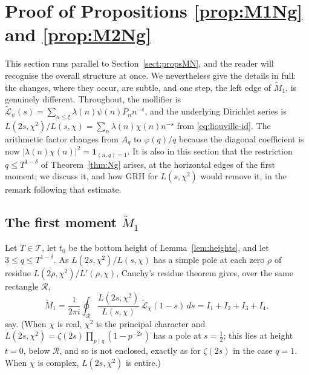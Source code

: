 \documentclass[12pt,a4paper,reqno]{amsart}
\theoremstyle{remark}
\numberwithin{equation}{section}
\begin{document}
\section{Proof of Propositions \ref{prop:M1Ng} and \ref{prop:M2Ng}}\label{sect:propsNg}

This section runs parallel to Section~\ref{sect:propsMN}, and the reader will recognise the overall structure at once. We nevertheless give the details in full: the changes, where they occur, are subtle, and one step, the left edge of $\widetilde M_1$, is genuinely different. Throughout, the mollifier is $\widetilde{\mathcal{L}}_\psi(s)=\sum_{n\le\xi}\lambda(n)\psi(n)P_n n^{-s}$, and the underlying Dirichlet series is $L(2s,\chi^2)/L(s,\chi)=\sum_n\lambda(n)\chi(n)n^{-s}$ from \eqref{eq:liouville-id}. The arithmetic factor changes from $A_q$ to $\varphi(q)/q$ because the diagonal coefficient is now $|\lambda(n)\chi(n)|^2=\mathbf 1_{(n,q)=1}$. It is also in this section that the restriction $q\le T^{1-\delta}$ of Theorem~\ref{thm:Ng} arises, at the horizontal edges of the first moment; we discuss it, and how GRH for $L(s,\chi^2)$ would remove it, in the remark following that estimate.

\subsection{The first moment $\widetilde M_1$}
Let $T\in\mathcal T$, let $t_0$ be the bottom height of Lemma~\ref{lem:heights}, and let $3\le q\le T^{1-\delta}$. As $L(2s,\chi^2)/L(s,\chi)$ has a simple pole at each zero $\rho$ of residue $L(2\rho,\chi^2)/L'(\rho,\chi)$, Cauchy's residue theorem gives, over the same rectangle $\mathcal R$,
\[
\widetilde M_1=\frac{1}{2\pi i}\oint_{\mathcal R}\frac{L(2s,\chi^2)}{L(s,\chi)}\,\widetilde{\mathcal{L}}_{\bar\chi}(1-s)\,ds=I_1+I_2+I_3+I_4 ,
\]
say. (When $\chi$ is real, $\chi^2$ is the principal character and $L(2s,\chi^2)=\zeta(2s)\prod_{p\mid q}(1-p^{-2s})$ has a pole at $s=\tfrac12$; this lies at height $t=0$, below $\mathcal R$, and so is not enclosed, exactly as for $\zeta(2s)$ in the case $q=1$. When $\chi$ is complex, $L(2s,\chi^2)$ is entire.)
\end{document}
